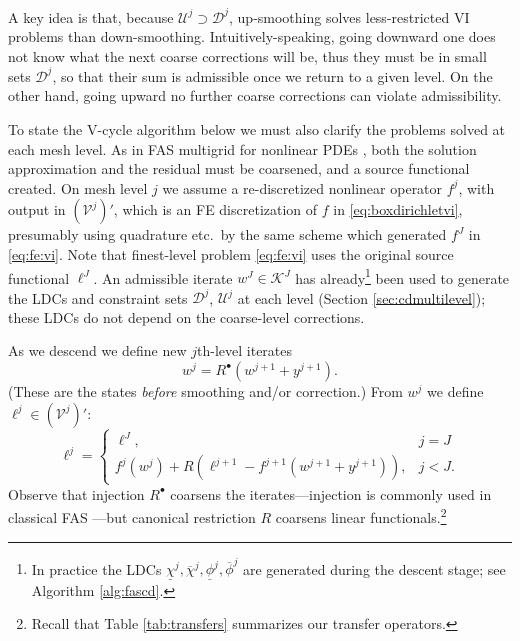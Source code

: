 \documentclass[letterpaper,final,12pt,reqno]{amsart}
\theoremstyle{cstyle}
\theoremstyle{cstyle*}
\theoremstyle{dstyle}
\numberwithin{equation}{section}
\numberwithin{figure}{section}
\numberwithin{table}{section}
\numberwithin{theorem}{section}
\newcommand{\cV}{\mathcal{V}}
\newcommand{\iR}{R^{\bullet}}
\begin{document}
A key idea is that, because $\mathcal{U}^j\supset \mathcal{D}^j$, up-smoothing solves less-restricted VI problems than down-smoothing.  Intuitively-speaking, going downward one does not know what the next coarse corrections will be, thus they must be in small sets $\mathcal{D}^j$, so that their sum is admissible once we return to a given level.  On the other hand, going upward no further coarse corrections can violate admissibility.

To state the V-cycle algorithm below we must also clarify the problems solved at each mesh level.  As in FAS multigrid for nonlinear PDEs \cite{BrandtLivne2011,Bruneetal2015,Trottenbergetal2001}, both the solution approximation and the residual must be coarsened, and a source functional created.  On mesh level $j$ we assume a re-discretized nonlinear operator $f^j$, with output in $(\cV^j)'$, which is an FE discretization of $f$ in \eqref{eq:boxdirichletvi}, presumably using quadrature etc.~by the same scheme which generated $f^J$ in \eqref{eq:fe:vi}.  Note that finest-level problem \eqref{eq:fe:vi} uses the original source functional $\ell^J$.  An admissible iterate $w^J \in \mathcal{K}^J$ has already\footnote{In practice the LDCs $\underline{\chi}^j,\overline{\chi}^j,\underline{\phi}^j,\overline{\phi}^j$ are generated during the descent stage; see Algorithm \ref{alg:fascd}.} been used to generate the LDCs and constraint sets $\mathcal{D}^j$, $\mathcal{U}^j$ at each level (Section \ref{sec:cdmultilevel}); these LDCs do not depend on the coarse-level corrections.

As we descend we define new $j$th-level iterates
\begin{equation}
w^j = \iR(w^{j+1} + y^{j+1}).  \label{eq:fe:definew}
\end{equation}
(These are the states \emph{before} smoothing and/or correction.)  From $w^j$ we define $\ell^j \in (\cV^j)'$:
\begin{equation}
\ell^j = \begin{cases} \ell^J, & j=J \\
                       f^j(w^j) + R\left(\ell^{j+1}-f^{j+1}(w^{j+1}+y^{j+1})\right), & j<J. \end{cases} \label{eq:fe:levelsource}
\end{equation}
Observe that injection $\iR$ coarsens the iterates---injection is commonly used in classical FAS \cite[section 5.3]{Trottenbergetal2001}---but canonical restriction $R$ coarsens linear functionals.\footnote{Recall that Table \ref{tab:transfers} summarizes our transfer operators.}
\end{document}
